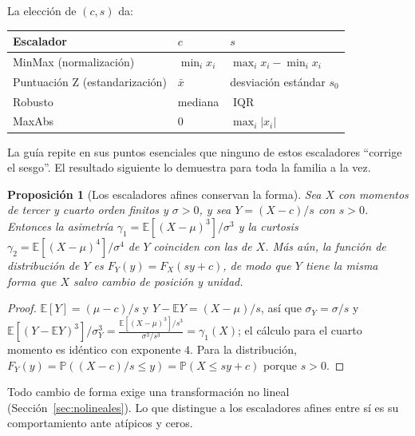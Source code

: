 \documentclass[11pt]{article}
\newtheorem{proposicion}[teorema]{Proposición}
\theoremstyle{definition}
\theoremstyle{remark}
\newcommand{\E}{\mathbb{E}}
\newcommand{\Prob}{\mathbb{P}}
\DeclareMathOperator{\IQR}{IQR}
\newcommand{\abs}[1]{\left\lvert #1\right\rvert}
\begin{document}
\noindent La elección de $(c,s)$ da:
\begin{center}
\begin{tabular}{@{}lll@{}}
\toprule
Escalador & $c$ & $s$\\
\midrule
MinMax (normalización) & $\min_i x_i$ & $\max_ix_i-\min_ix_i$\\
Puntuación Z (estandarización) & $\bar x$ & desviación estándar $s_0$\\
Robusto & mediana & $\IQR$\\
MaxAbs & $0$ & $\max_i\abs{x_i}$\\
\bottomrule
\end{tabular}
\end{center}

\noindent La guía repite en sus puntos esenciales que ninguno de estos escaladores ``corrige el sesgo''. El resultado siguiente lo demuestra para toda la familia a la vez.

\begin{proposicion}[Los escaladores afines conservan la forma]\label{prop:forma}
\noindent Sea $X$ con momentos de tercer y cuarto orden finitos y $\sigma>0$, y sea $Y=(X-c)/s$ con $s>0$. Entonces la asimetría $\gamma_1=\E[(X-\mu)^3]/\sigma^3$ y la curtosis $\gamma_2=\E[(X-\mu)^4]/\sigma^4$ de $Y$ coinciden con las de $X$. Más aún, la función de distribución de $Y$ es $F_Y(y)=F_X(sy+c)$, de modo que $Y$ tiene la misma forma que $X$ salvo cambio de posición y unidad.
\end{proposicion}
\begin{proof}
\noindent $\E[Y]=(\mu-c)/s$ y $Y-\E Y=(X-\mu)/s$, así que $\sigma_Y=\sigma/s$ y $\E[(Y-\E Y)^3]/\sigma_Y^3=\frac{\E[(X-\mu)^3]/s^3}{\sigma^3/s^3}=\gamma_1(X)$; el cálculo para el cuarto momento es idéntico con exponente $4$. Para la distribución, $F_Y(y)=\Prob((X-c)/s\le y)=\Prob(X\le sy+c)$ porque $s>0$.
\end{proof}

\noindent Todo cambio de forma exige una transformación no lineal (Sección~\ref{sec:nolineales}). Lo que distingue a los escaladores afines entre sí es su comportamiento ante atípicos y ceros.
\end{document}
